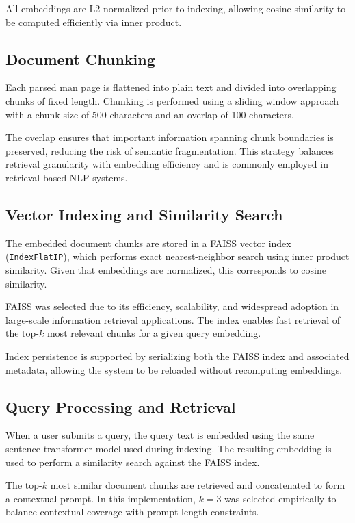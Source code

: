 \documentclass[conference]{IEEEtran}
\begin{document}
All embeddings are L2-normalized prior to indexing, allowing cosine similarity to be computed efficiently via inner product.

\subsection{Document Chunking}

Each parsed man page is flattened into plain text and divided into overlapping chunks of fixed length. Chunking is performed using a sliding window approach with a chunk size of 500 characters and an overlap of 100 characters.

The overlap ensures that important information spanning chunk boundaries is preserved, reducing the risk of semantic fragmentation. This strategy balances retrieval granularity with embedding efficiency and is commonly employed in retrieval-based NLP systems.

\subsection{Vector Indexing and Similarity Search}

The embedded document chunks are stored in a FAISS vector index (\texttt{IndexFlatIP}), which performs exact nearest-neighbor search using inner product similarity. Given that embeddings are normalized, this corresponds to cosine similarity.

FAISS was selected due to its efficiency, scalability, and widespread adoption in large-scale information retrieval applications. The index enables fast retrieval of the top-$k$ most relevant chunks for a given query embedding.

Index persistence is supported by serializing both the FAISS index and associated metadata, allowing the system to be reloaded without recomputing embeddings.

\subsection{Query Processing and Retrieval}

When a user submits a query, the query text is embedded using the same sentence transformer model used during indexing. The resulting embedding is used to perform a similarity search against the FAISS index.

The top-$k$ most similar document chunks are retrieved and concatenated to form a contextual prompt. In this implementation, $k=3$ was selected empirically to balance contextual coverage with prompt length constraints.
\end{document}
